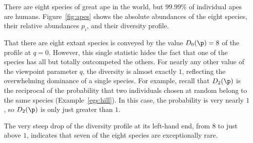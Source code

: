 \begin{example}
% 
There are eight species of great ape in the world, but
$99.99\%$ of individual apes are humans.%
%
%
Figure~\ref{fig:apes} shows the absolute abundances of the eight species,
their relative abundances $p_i$, and their diversity profile.

That there are eight extant species is conveyed by the value $D_0(\p) = 8$
of the profile at $q = 0$. However, this single statistic hides the fact
that one of the species has all but totally outcompeted the others.  For
nearly any other value of the viewpoint parameter $q$, the diversity is
almost exactly $1$, reflecting the overwhelming dominance of a single
species.  For example, recall that $D_2(\p)$ is the reciprocal of the
probability that two individuals chosen at random belong to the same
species (Example~\ref{egs:hill}).  In this case, the
probability is very nearly $1$, so $D_2(\p)$ is only just greater
than $1$.

The very steep drop of the diversity profile at its left-hand end,
from $8$ to just above $1$, indicates that seven of the eight species are
exceptionally rare.
\end{example}

